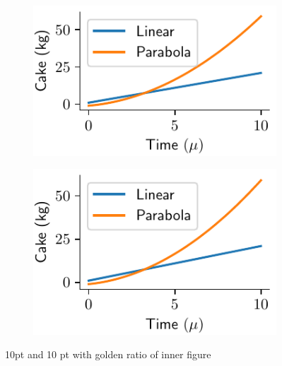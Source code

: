 \documentclass[a4paper,11pt]{report}
\begin{document}
\begin{figure}
	\centering
	\begin{subfigure}{0.49\textwidth}
		\centering
		\includegraphics[width=1\linewidth]{fig/TwoGolden11.pdf}
		\caption{}
	\end{subfigure}
	\begin{subfigure}{0.49\textwidth}
		\centering
		\includegraphics[width=1\linewidth]{fig/TwoInnerGolden11.pdf}
		\caption{}
	\end{subfigure}
	\caption{10pt and 10 pt with golden ratio of inner figure}
\end{figure}
\end{document}
